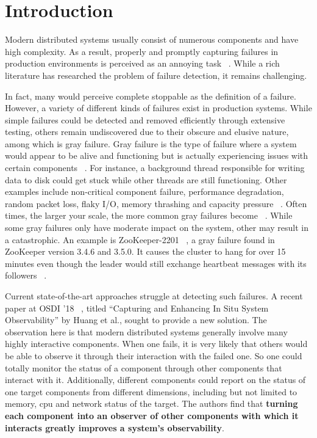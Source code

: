 \section{Introduction}
Modern distributed systems usually consist of numerous components and have high complexity. As a result, properly and promptly capturing failures in production environments is perceived as an annoying task ~\cite{dean2009designs, liu2007wids}. While a rich literature has researched the problem of failure detection, it remains challenging.

In fact, many would perceive complete stoppable as the definition of a failure. However, a variety of different kinds of failures exist in production systems. While simple failures could be detected and removed efficiently through extensive testing, others remain undiscovered due to their obscure and elusive nature, among which is gray failure. Gray failure is the type of failure where a system would appear to be alive and functioning but is actually experiencing issues with certain components ~\cite{huang2017gray}. For instance, a background thread responsible for writing data to disk could get stuck while other threads are still functioning. Other examples include non-critical component failure, performance degradation, random packet loss, flaky I/O, memory thrashing and capacity pressure ~\cite{huang2017gray}. Often times, the larger your scale, the more common gray failures become ~\cite{Grayfail28:online}. While some gray failures only have moderate impact on the system, other may result in a catastrophic. An example is ZooKeeper-2201 ~\cite{httpsiss99:online}, a gray failure found in ZooKeeper version 3.4.6 and 3.5.0. It causes the cluster to hang for over 15 minutes even though the leader would still exchange heartbeat messages with its followers ~\cite{beschastnikh2016debugging}. 

Current state-of-the-art approaches struggle at detecting such failures. A recent paper at OSDI '18 ~\cite{huang2018capturing}, titled ``Capturing and Enhancing In Situ System Observability'' by Huang et al., sought to provide a new solution. The observation here is that modern distributed systems generally involve many highly interactive components. When one fails, it is very likely that others would be able to observe it through their interaction with the failed one. So one could totally monitor the status of a component through other components that interact with it. Additionally, different components could report on the status of one target components from different dimensions, including but not limited to memory, cpu and network status of the target. The authors find that \textbf{turning each component into an observer of other components with which it interacts greatly improves a system's observability}. 

